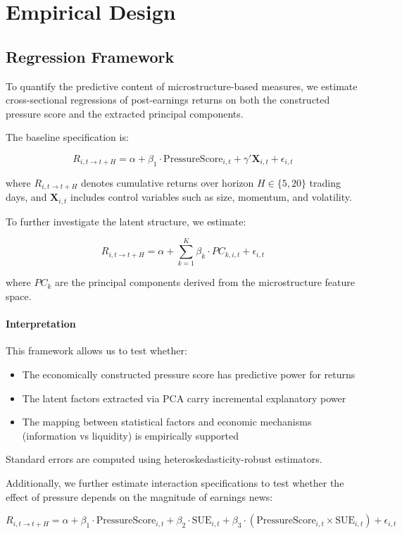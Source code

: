 \section{Empirical Design}

\subsection{Regression Framework}

To quantify the predictive content of microstructure-based measures, we estimate cross-sectional regressions of post-earnings returns on both the constructed pressure score and the extracted principal components.

The baseline specification is:

\begin{equation}
R_{i,t \rightarrow t+H} = \alpha + \beta_1 \cdot \text{PressureScore}_{i,t} + \gamma' \mathbf{X}_{i,t} + \epsilon_{i,t}
\end{equation}

where $R_{i,t \rightarrow t+H}$ denotes cumulative returns over horizon $H \in \{5,20\}$ trading days, and $\mathbf{X}_{i,t}$ includes control variables such as size, momentum, and volatility.

To further investigate the latent structure, we estimate:

\begin{equation}
R_{i,t \rightarrow t+H} = \alpha + \sum_{k=1}^{K} \beta_k \cdot PC_{k,i,t} + \epsilon_{i,t}
\end{equation}

where $PC_k$ are the principal components derived from the microstructure feature space.

\paragraph{Interpretation}

This framework allows us to test whether:
\begin{itemize}
    \item The economically constructed pressure score has predictive power for returns
    \item The latent factors extracted via PCA carry incremental explanatory power
    \item The mapping between statistical factors and economic mechanisms (information vs liquidity) is empirically supported
\end{itemize}

Standard errors are computed using heteroskedasticity-robust estimators.

Additionally, we further estimate interaction specifications to test whether the effect of pressure depends on the magnitude of earnings news:

\begin{equation}
R_{i,t \rightarrow t+H} = \alpha + \beta_1 \cdot \text{PressureScore}_{i,t} + \beta_2 \cdot \text{SUE}_{i,t} + \beta_3 \cdot (\text{PressureScore}_{i,t} \times \text{SUE}_{i,t}) + \epsilon_{i,t}
\end{equation}
